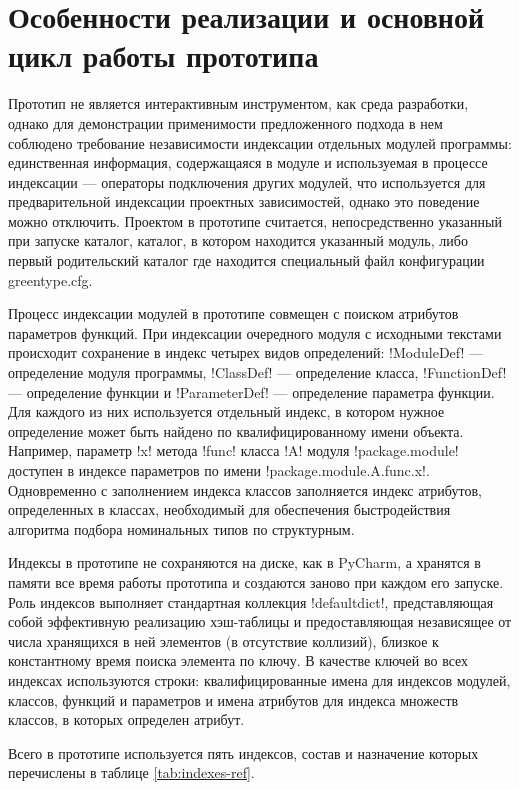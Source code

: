 \section{Особенности реализации и основной цикл работы прототипа}
\label{sec:prototype-architecture}

Прототип не является интерактивным инструментом, как среда разработки, однако
для демонстрации применимости предложенного подхода в нем соблюдено требование
независимости индексации отдельных модулей программы: единственная информация,
содержащаяся в модуле и используемая в процессе индексации --- операторы
подключения других модулей, что используется для предварительной индексации
проектных зависимостей, однако это поведение можно отключить. Проектом в
прототипе считается, непосредственно указанный при запуске каталог, каталог, в
котором находится указанный модуль, либо первый родительский каталог где
находится специальный файл конфигурации greentype.cfg.

Процесс индексации модулей в прототипе совмещен с поиском атрибутов параметров
функций. При индексации очередного модуля с исходными текстами происходит
сохранение в индекс четырех видов определений: !ModuleDef! --- определение
модуля программы, !ClassDef! --- определение класса, !FunctionDef! ---
определение функции и !ParameterDef! --- определение параметра функции. Для
каждого из них используется отдельный индекс, в котором нужное определение может
быть найдено по квалифицированному имени объекта. Например, параметр !x! метода
!func! класса !A! модуля !package.module! доступен в индексе параметров по имени
!package.module.A.func.x!. Одновременно с заполнением индекса классов
заполняется индекс атрибутов, определенных в классах, необходимый для
обеспечения быстродействия алгоритма подбора номинальных типов по структурным.

Индексы в прототипе не сохраняются на диске, как в PyCharm, а хранятся в
памяти все время работы прототипа и создаются заново при каждом его запуске. Роль
индексов выполняет стандартная коллекция !defaultdict!, представляющая собой
эффективную реализацию хэш-таблицы и предоставляющая независящее от числа
хранящихся в ней элементов (в отсутствие коллизий), близкое к константному
время поиска элемента по ключу. В качестве ключей во всех индексах используются
строки: квалифицированные имена для индексов модулей, классов, функций и
параметров и имена атрибутов для индекса множеств классов, в которых определен
атрибут.

Всего в прототипе используется пять индексов, состав и назначение которых
перечислены в таблице \ref{tab:indexes-ref}.

